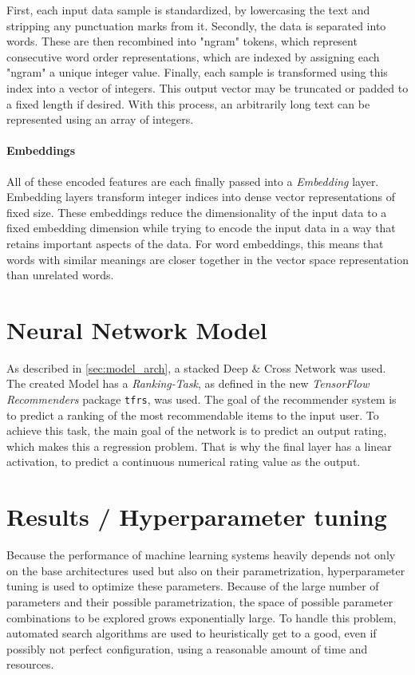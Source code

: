 \documentclass[10pt,final,journal,a4paper,oneside,twocolumn]{IEEEtran}
\begin{document}
First, each input data sample is standardized, by lowercasing the text and stripping any punctuation marks from it.
Secondly, the data is separated into words. These are then recombined into "ngram" tokens, which represent consecutive word order representations, which are indexed by assigning each "ngram" a unique integer value. Finally, each sample is transformed using this index into a vector of integers.
This output vector may be truncated or padded to a fixed length if desired.
With this process, an arbitrarily long text can be represented using an array of integers.

\paragraph{Embeddings}
All of these encoded features are each finally passed into a \emph{Embedding} layer. 
Embedding layers transform integer indices into dense vector representations of fixed size. These embeddings reduce the dimensionality of the input data to a fixed embedding dimension while trying to encode the input data in a way that retains important aspects of the data. For word embeddings, this means that words with similar meanings are closer together in the vector space representation than unrelated words.



\section{Neural Network Model}
As described in \autoref{sec:model_arch}, a stacked Deep \& Cross Network was used.
The created Model has a \emph{Ranking-Task}, as defined in the new \emph{TensorFlow Recommenders} package \texttt{tfrs}, was used. The goal of the recommender system is to predict a ranking of the most recommendable items to the input user. To achieve this task, the main goal of the network is to predict an output rating, which makes this a regression problem. That is why the final layer has a linear activation, to predict a continuous numerical rating value as the output.




\section{Results / Hyperparameter tuning}
Because the performance of machine learning systems heavily depends not only on the base architectures used but also on their parametrization, hyperparameter tuning is used to optimize these parameters.
Because of the large number of parameters and their possible parametrization, the space of possible parameter combinations to be explored grows exponentially large. To handle this problem, automated search algorithms are used to heuristically get to a good, even if possibly not perfect configuration, using a reasonable amount of time and resources.
\end{document}

